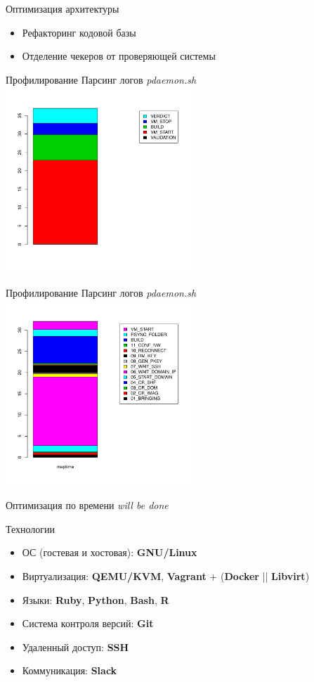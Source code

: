 \documentclass{beamer}
\begin{document}
\begin{frame}{Оптимизация архитектуры}
	\begin{itemize}
		\item Рефакторинг кодовой базы
		\item Отделение чекеров от проверяющей системы
	\end{itemize}
\end{frame}

\begin{frame}{Профилирование}
	Парсинг логов \textit{pdaemon.sh}
	\includegraphics[width=70mm]{./libvirt_bar.pdf}
\end{frame}

\begin{frame}{Профилирование}
	Парсинг логов \textit{pdaemon.sh}
	\includegraphics[width=70mm]{./vm_start_bar.pdf}
\end{frame}

\begin{frame}{Оптимизация по времени}
	\textit{will be done}
\end{frame}

\begin{frame}{Технологии}
	\begin{itemize}
		\item ОС (гостевая и хостовая): \textbf{GNU/Linux}
		\item Виртуализация: \textbf{QEMU/KVM}, \textbf{Vagrant} + (\textbf{Docker} || \textbf{Libvirt})
		\item Языки: \textbf{Ruby}, \textbf{Python}, \textbf{Bash}, \textbf{R}
		\item Система контроля версий: \textbf{Git}
		\item Удаленный доступ: \textbf{SSH}
		\item Коммуникация: \textbf{Slack}
	\end{itemize}
\end{frame}
\end{document}

